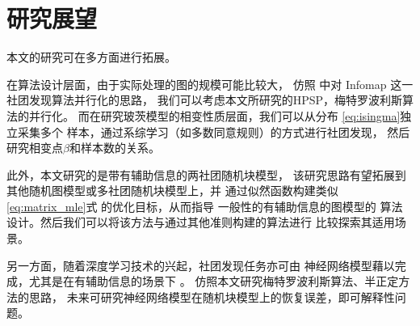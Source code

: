 \section{研究展望}
本文的研究可在多方面进行拓展。

在算法设计层面，由于实际处理的图的规模可能比较大，
仿照 \citet{faysal2021parallel} 中对 Infomap 这一社团发现算法并行化的思路，
我们可以考虑本文所研究的HPSP，梅特罗波利斯算法的并行化。
而在研究玻茨模型的相变性质层面，我们可以从分布
\eqref{eq:isingma}独立采集多个
样本，通过系综学习（如多数同意规则）的方式进行社团发现，
然后研究相变点$\beta$和样本数的关系。

此外，本文研究的是带有辅助信息的两社团随机块模型，
该研究思路有望拓展到其他随机图模型或多社团随机块模型上，并
通过似然函数构建类似\eqref{eq:matrix_mle}式
的优化目标，从而指导
一般性的有辅助信息的图模型的
算法设计。然后我们可以将该方法与通过其他准则\cite{chunaev2020community}构建的算法进行
比较探索其适用场景。

另一方面，随着深度学习技术的兴起，社团发现任务亦可由
神经网络模型藉以完成，尤其是在有辅助信息的场景下 \cite{cao2018incorporating}。
仿照本文研究梅特罗波利斯算法、半正定方法的思路，
未来可研究神经网络模型在随机块模型上的恢复误差，即可解释性问题。